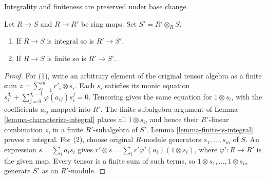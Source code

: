\begin{lemma}
\label{lemma-base-change-integral}
\begin{slogan}
Integrality and finiteness are preserved under base change.
\end{slogan}
Let $R \to S$ and $R \to R'$ be ring maps.
Set $S' = R' \otimes_R S$.
\begin{enumerate}
\item If $R \to S$ is integral so is $R' \to S'$.
\item If $R \to S$ is finite so is $R' \to S'$.
\end{enumerate}
\end{lemma}

\begin{proof}
For (1), write an arbitrary element of the original tensor algebra
as a finite sum $z=\sum_{i=1}^m r'_i\otimes s_i$.
Each $s_i$ satisfies its monic equation
$s_i^{d_i}+\sum_{j=0}^{d_i-1}\varphi(a_{ij})s_i^j=0$.
Tensoring gives the same equation for $1\otimes s_i$, with the
coefficients $a_{ij}$ mapped into $R'$. The finite-subalgebra
argument of Lemma \ref{lemma-characterize-integral} places all
$1\otimes s_i$, and hence their $R'$-linear combination $z$,
in a finite $R'$-subalgebra of $S'$. Lemma
\ref{lemma-finite-is-integral} proves $z$ integral.
For (2), choose original $R$-module generators $s_1,\ldots,s_m$
of $S$. An expression $s=\sum_i a_i s_i$ gives
$r'\otimes s=\sum_i r'\varphi'(a_i)(1\otimes s_i)$, where
$\varphi':R\to R'$ is the given map. Every tensor is a finite
sum of such terms, so $1\otimes s_1,\ldots,1\otimes s_m$
generate $S'$ as an $R'$-module.
\end{proof}